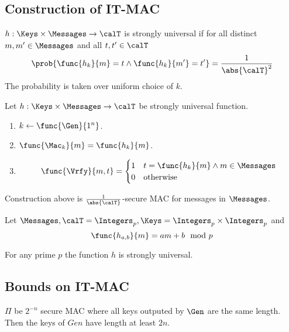 \subsection{Construction of IT-MAC}
\begin{definition}
    \(h: \Keys \times \Messages \to \calT\) is strongly universal if for all distinct \(m,m' \in \Messages\) and all \(t,t' \in \calT\) 
    \begin{equation*}
        \prob{\func{h_k}{m} =t \land \func{h_k}{m'} = t'} = \dfrac{1}{\abs{\calT}^2}
    \end{equation*}
    The probability is taken over uniform choice of \(k\).
\end{definition}

Let \(h:\Keys \times \Messages \to \calT\) be strongly universal function. 
\begin{enumerate}
    \item \(k \gets \func{\Gen}{1^n}\).
    \item \(\func{\Mac_k}{m} = \func{h_k}{m}\).
    \item 
    \begin{equation*}
        \func{\Vrfy}{m,t} = \begin{cases}
            1 & t= \func{h_k}{m} \land m \in \Messages\\
            0 & \text{otherwise}
        \end{cases}
    \end{equation*}
\end{enumerate}

\begin{theorem}
    Construction above is \(\frac{1}{\abs{\calT}}\)-secure MAC for messages in \(\Messages\).
\end{theorem}

Let \(\Messages,\calT = \Integers_p,\Keys = \Integers_p \times \Integers_p\) and 
\begin{equation*}
    \func{h_{a,b}}{m} = am + b \mod{p}
\end{equation*}

\begin{theorem}
    For any prime \(p\) the function \(h\) is strongly universal.
\end{theorem}

\subsection{Bounds on IT-MAC}
\begin{theorem}
    \(\Pi\) be \(2^{-n}\) secure MAC where all keys outputed by \(\Gen\) are the same length. Then the keys of \(Gen\) have length at least \(2n\).
\end{theorem}